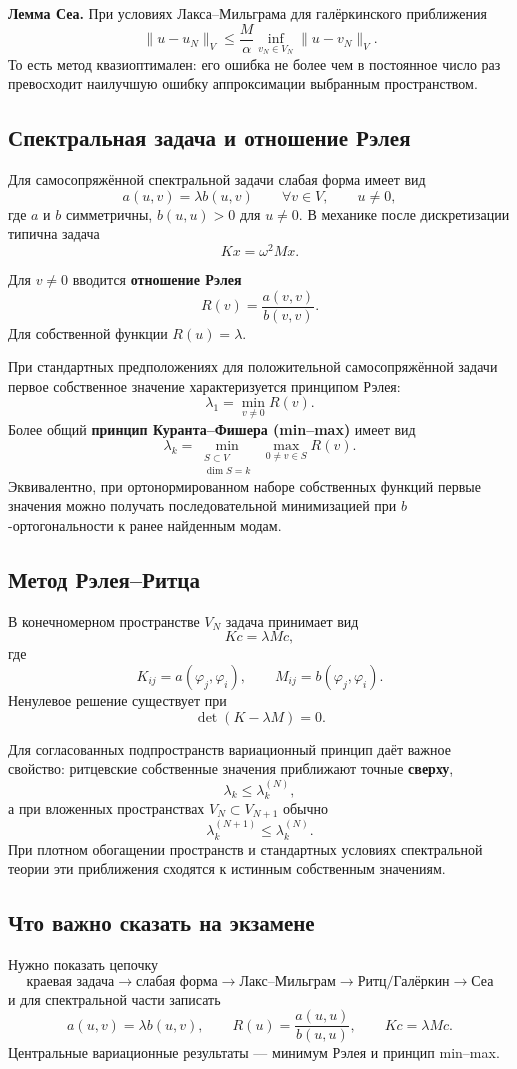 \textbf{Лемма Сеа.} При условиях Лакса--Мильграма для галёркинского приближения
\[
\boxed{
\|u-u_N\|_V
\le
\frac{M}{\alpha}
\inf_{v_N\in V_N}\|u-v_N\|_V.
}
\]
То есть метод квазиоптимален: его ошибка не более чем в постоянное число раз превосходит наилучшую ошибку аппроксимации выбранным пространством.

\subsection{Спектральная задача и отношение Рэлея}

Для самосопряжённой спектральной задачи слабая форма имеет вид
\[
a(u,v)=\lambda b(u,v)
\qquad \forall v\in V,
\qquad u\ne0,
\]
где $a$ и $b$ симметричны, $b(u,u)>0$ для $u\ne0$. В механике после дискретизации типична задача
\[
Kx=\omega^2Mx.
\]

Для $v\ne0$ вводится \textbf{отношение Рэлея}
\[
R(v)=\frac{a(v,v)}{b(v,v)}.
\]
Для собственной функции $R(u)=\lambda$.

При стандартных предположениях для положительной самосопряжённой задачи первое собственное значение характеризуется принципом Рэлея:
\[
\boxed{\lambda_1=\min_{v\ne0}R(v)}.
\]
Более общий \textbf{принцип Куранта--Фишера (min--max)} имеет вид
\[
\boxed{
\lambda_k=
\min_{\substack{S\subset V\\ \dim S=k}}
\;\max_{0\ne v\in S}R(v).
}
\]
Эквивалентно, при ортонормированном наборе собственных функций первые значения можно получать последовательной минимизацией при $b$-ортогональности к ранее найденным модам.

\subsection{Метод Рэлея--Ритца}

В конечномерном пространстве $V_N$ задача принимает вид
\[
Kc=\lambda Mc,
\]
где
\[
K_{ij}=a(\varphi_j,\varphi_i),
\qquad
M_{ij}=b(\varphi_j,\varphi_i).
\]
Ненулевое решение существует при
\[
\det(K-\lambda M)=0.
\]

Для согласованных подпространств вариационный принцип даёт важное свойство: ритцевские собственные значения приближают точные \textbf{сверху},
\[
\lambda_k\le \lambda_k^{(N)},
\]
а при вложенных пространствах $V_N\subset V_{N+1}$ обычно
\[
\lambda_k^{(N+1)}\le \lambda_k^{(N)}.
\]
При плотном обогащении пространств и стандартных условиях спектральной теории эти приближения сходятся к истинным собственным значениям.

\subsection{Что важно сказать на экзамене}

Нужно показать цепочку
\[
\boxed{
\text{краевая задача}
\rightarrow
\text{слабая форма}
\rightarrow
\text{Лакс--Мильграм}
\rightarrow
\text{Ритц/Галёркин}
\rightarrow
\text{Сеа}}
\]
и для спектральной части записать
\[
a(u,v)=\lambda b(u,v),
\qquad
R(u)=\frac{a(u,u)}{b(u,u)},
\qquad
Kc=\lambda Mc.
\]
Центральные вариационные результаты --- минимум Рэлея и принцип min--max.

\newpage
